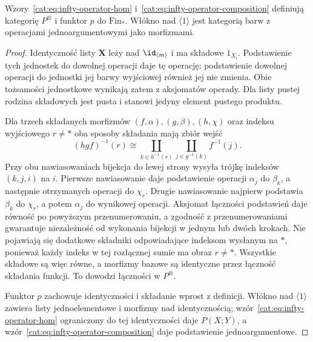 \begin{stwierdzenie}\label{cat:prop:infty-operator-category}
Wzory~\eqref{cat:eq:infty-operator-hom} i~\eqref{cat:eq:infty-operator-composition} definiują kategorię $P^\otimes$ i funktor $p$ do $\mathrm{Fin}_*$. Włókno nad $\langle1\rangle$ jest kategorią barw z operacjami jednoargumentowymi jako morfizmami.
\end{stwierdzenie}
\begin{proof}
Identyczność listy $\mathbf X$ leży nad $\id_{\langle m\rangle}$ i ma składowe $1_{X_i}$. Podstawienie tych jednostek do dowolnej operacji daje tę operację; podstawienie dowolnej operacji do jednostki jej barwy wyjściowej również jej nie zmienia. Obie tożsamości jednostkowe wynikają zatem z aksjomatów operady. Dla listy pustej rodzina składowych jest pusta i stanowi jedyny element pustego produktu.

Dla trzech składanych morfizmów $(f,\alpha),(g,\beta),(h,\chi)$ oraz indeksu wyjściowego $r\neq *$ oba sposoby składania mają zbiór wejść
\[
 (hgf)^{-1}(r)
 \cong\coprod_{k\in h^{-1}(r)}
       \coprod_{j\in g^{-1}(k)} f^{-1}(j).
\]
Przy obu nawiasowaniach bijekcja do lewej strony wysyła trójkę indeksów $(k,j,i)$ na $i$. Pierwsze nawiasowanie daje podstawienie operacji $\alpha_j$ do $\beta_k$, a następnie otrzymanych operacji do $\chi_r$. Drugie nawiasowanie najpierw podstawia $\beta_k$ do $\chi_r$, a potem $\alpha_j$ do wynikowej operacji. Aksjomat łączności podstawień daje równość po powyższym przenumerowaniu, a zgodność z przenumerowaniami gwarantuje niezależność od wykonania bijekcji w jednym lub dwóch krokach. Nie pojawiają się dodatkowe składniki odpowiadające indeksom wysłanym na $*$, ponieważ każdy indeks w tej rozłącznej sumie ma obraz $r\neq *$. Wszystkie składowe są więc równe, a morfizmy bazowe są identyczne przez łączność składania funkcji. To dowodzi łączności w $P^\otimes$.

Funktor $p$ zachowuje identyczności i składanie wprost z definicji. Włókno nad $\langle1\rangle$ zawiera listy jednoelementowe i morfizmy nad identycznością; wzór~\eqref{cat:eq:infty-operator-hom} ograniczony do tej identyczności daje $P(X;Y)$, a wzór~\eqref{cat:eq:infty-operator-composition} daje podstawienie jednoargumentowe.
\end{proof}

